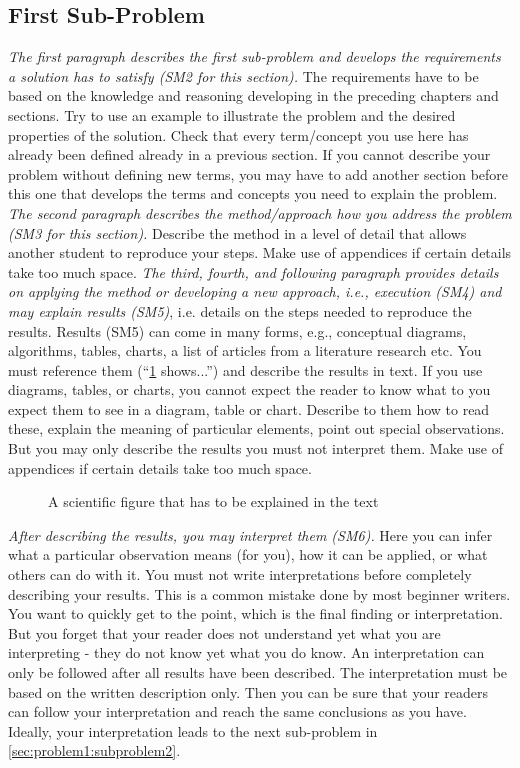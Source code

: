 \documentclass[peerreview,a4paper,english]{IEEEtran}[2015/08/26]
\begin{document}
\subsection{First Sub-Problem}\label{sec:problem1:subproblem1}
\emph{The first paragraph describes the first sub-problem and develops the requirements a solution has to satisfy (SM2 for this section).} The requirements have to be based on the knowledge and reasoning developing in the preceding chapters and sections. Try to use an example to illustrate the problem and the desired properties of the solution. Check that every term/concept you use here has already been defined already in a previous section. If you cannot describe your problem without defining new terms, you may have to add another section before this one that develops the terms and concepts you need to explain the problem.
\emph{The second paragraph describes the method/approach how you address the problem (SM3 for this section).} Describe the method in a level of detail that allows another student to reproduce your steps.
Make use of appendices %
if certain details take too much space.
\emph{The third, fourth, and following paragraph provides details on applying the method or developing a new approach, i.e., execution (SM4) and may explain results (SM5)}, i.e. details on the steps needed to reproduce the results.
Results (SM5) can come in many forms, e.g., conceptual diagrams, algorithms, tables, charts, a list of articles from a literature research etc. You must reference them (``\cref{fig:my_label} shows...'') and describe the results in text. If you use diagrams, tables, or charts, you cannot expect the reader to know what to you expect them to see in a diagram, table or chart. Describe to them how to read these, explain the meaning of particular elements, point out special observations. But you may only describe the results you must not interpret them. Make use of appendices if certain details take too much space.
\begin{figure}
    \centering
    \caption{A scientific figure that has to be explained in the text}
    \label{fig:my_label}
\end{figure}
\emph{After describing the results, you may interpret them (SM6).} Here you can infer what a particular observation means (for you), how it can be applied, or what others can do with it. You must not write interpretations before completely describing your results. This is a common mistake done by most beginner writers. You want to quickly get to the point, which is the final finding or interpretation. But you forget that your reader does not understand yet what you are interpreting - they do not know yet what you do know. An interpretation can only be followed after all results have been described. The interpretation must be based on the written description only. Then you can be sure that your readers can follow your interpretation and reach the same conclusions as you have.
Ideally, your interpretation leads to the next sub-problem in \cref{sec:problem1:subproblem2}.
\end{document}
